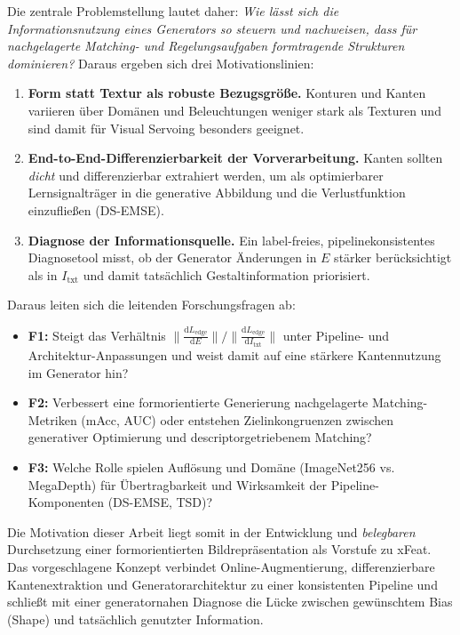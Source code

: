 \newpage

Die zentrale Problemstellung lautet daher: \emph{Wie lässt sich die Informationsnutzung eines Generators so steuern und nachweisen, dass für nachgelagerte Matching- und Regelungsaufgaben formtragende Strukturen dominieren?} 
Daraus ergeben sich drei Motivationslinien:
\begin{enumerate}
    \item \textbf{Form statt Textur als robuste Bezugsgröße.} Konturen und Kanten variieren über Domänen und Beleuchtungen weniger stark als Texturen und sind damit für Visual Servoing besonders geeignet.
    \item \textbf{End-to-End-Differenzierbarkeit der Vorverarbeitung.} Kanten sollten \emph{dicht} und differenzierbar extrahiert werden, um als optimierbarer Lernsignalträger in die generative Abbildung und die Verlustfunktion einzufließen (DS-EMSE).
    \item \textbf{Diagnose der Informationsquelle.} Ein label-freies, pipelinekonsistentes Diagnosetool misst, ob der Generator Änderungen in $E$ stärker berücksichtigt als in $I_{\text{txt}}$ und damit tatsächlich Gestaltinformation priorisiert.
\end{enumerate}

Daraus leiten sich die leitenden Forschungsfragen ab:
\begin{itemize}
    \item \textbf{F1:} Steigt das Verhältnis \(\big\lVert \tfrac{\mathrm{d}L_{\text{edge}}}{\mathrm{d}E}\big\rVert / \big\lVert \tfrac{\mathrm{d}L_{\text{edge}}}{\mathrm{d}I_{\text{txt}}}\big\rVert\) unter Pipeline- und Architektur-Anpassungen und weist damit auf eine stärkere Kantennutzung im Generator hin?
    \item \textbf{F2:} Verbessert eine formorientierte Generierung nachgelagerte Matching-Metriken (\ac{mAcc}, \ac{AUC}) oder entstehen Zielinkongruenzen zwischen generativer Optimierung und descriptorgetriebenem Matching?
    \item \textbf{F3:} Welche Rolle spielen Auflösung und Domäne (ImageNet256 vs. MegaDepth) für Übertragbarkeit und Wirksamkeit der Pipeline-Komponenten (DS-EMSE, TSD)?
\end{itemize}

Die Motivation dieser Arbeit liegt somit in der Entwicklung und \emph{belegbaren} Durchsetzung einer formorientierten Bildrepräsentation als Vorstufe zu \ac{xFeat}. Das vorgeschlagene Konzept verbindet Online-Augmentierung, differenzierbare Kantenextraktion und Generatorarchitektur zu einer konsistenten Pipeline und schließt mit einer generatornahen Diagnose die Lücke zwischen gewünschtem Bias (Shape) und tatsächlich genutzter Information.


